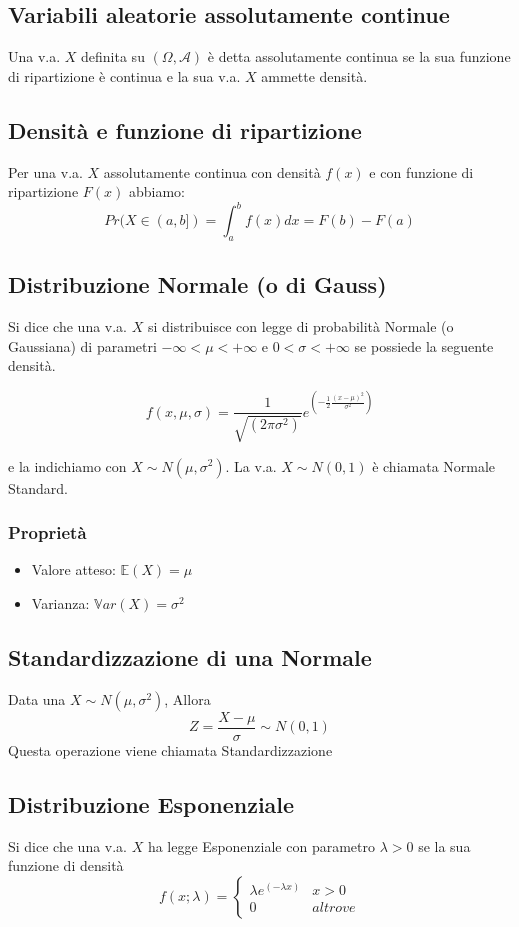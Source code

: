 \documentclass[a4paper]{report}
\begin{document}
  \subsection{Variabili aleatorie assolutamente continue}
  Una v.a. $X$ definita su $(\Omega, \mathcal{A})$ è detta assolutamente continua se la sua funzione di ripartizione è continua e la sua v.a. $X$ ammette densità.

  \subsection{Densità e funzione di ripartizione}
  Per una v.a. $X$ assolutamente continua con densità $f(x)$ e con funzione di ripartizione $F(x)$ abbiamo:
  \[ Pr(X \in (a,b]) = \int_{a}^{b} f(x) dx = F(b) - F(a) \]

  \subsection{Distribuzione Normale (o di Gauss)}
  Si dice che una v.a. $X$ si distribuisce con legge di probabilità Normale (o Gaussiana) di parametri $-\infty < \mu < +\infty$ e $ 0 < \sigma < +\infty$ se possiede la seguente densità.

  \[ f(x,\mu,\sigma) = \frac{1}{\sqrt{(2 \pi \sigma^2)}} e^{( -\frac{1}{2} \frac{(x-\mu)^2}{\sigma^2})} \]

  e la indichiamo con $X \sim N(\mu, \sigma^2)$. La v.a. $X \sim N(0,1)$ è chiamata Normale Standard.

  \subsubsection{Proprietà}
  \begin{itemize}
    \item Valore atteso: $\mathbb{E}(X) = \mu$
    \item Varianza: $\mathbb{V}ar(X) = \sigma^2$
  \end{itemize}

  \subsection{Standardizzazione di una Normale}
  Data una $X \sim N(\mu,\sigma^2)$, Allora
  \[ Z = \frac{X-\mu}{\sigma} \sim N(0,1) \]
  Questa operazione viene chiamata Standardizzazione


  \subsection{Distribuzione Esponenziale}
  Si dice che una v.a. $X$ ha legge Esponenziale con parametro $\lambda >0$ se la sua funzione di densità
  \[
    f(x;\lambda) =
    \begin{cases}
      \lambda e^{(-\lambda x)} & x > 0 \\
      0 & altrove
    \end{cases}
  \]
\end{document}
